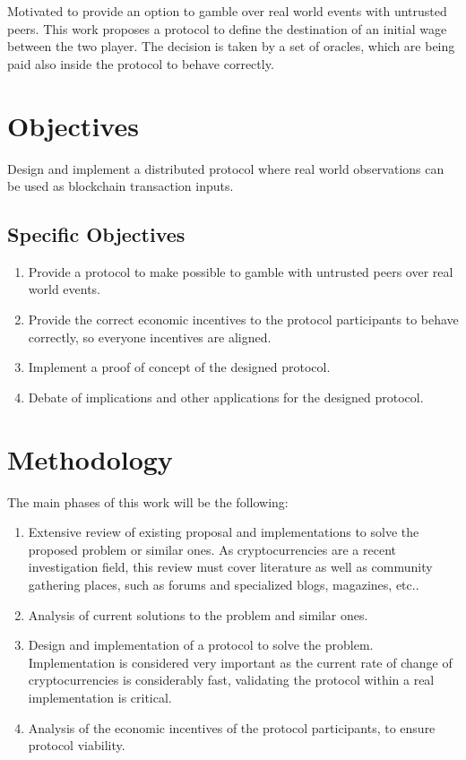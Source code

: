 Motivated to provide an option to gamble over real world events with untrusted
 peers. This work proposes a protocol to define the destination of an initial
 wage between the two player. The decision is taken by a set of oracles, which
 are being paid also inside the protocol to behave correctly.

\section{Objectives}
Design and implement a distributed protocol where real world observations can
  be used as blockchain transaction inputs.

\subsection{Specific Objectives}
\begin{enumerate}
	\item Provide a protocol to make possible to gamble with untrusted peers over
	  real world events.
	\item Provide the correct economic incentives to the protocol participants to
	  behave correctly, so everyone incentives are aligned.
	\item Implement a proof of concept of the designed protocol.
	\item Debate of implications and other applications for the designed protocol.
\end{enumerate}

\section{Methodology}
The main phases of this work will be the following:
\begin{enumerate}
	\item Extensive review of existing proposal and implementations to solve
	  the proposed problem or similar ones. As cryptocurrencies are a recent
	  investigation field, this review must cover literature as well as
	  community gathering places, such as forums and specialized blogs, magazines,
	  etc..
  \item Analysis of current solutions to the problem and similar ones.
  \item Design and implementation of a protocol to solve the problem.
    Implementation is considered very important as the current rate of change
    of cryptocurrencies is considerably fast, validating the protocol within a
    real implementation is critical.
  \item Analysis of the economic incentives of the protocol participants, to
    ensure protocol viability.
\end{enumerate}


